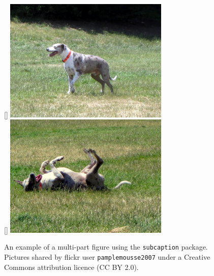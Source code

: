 \documentclass[12pt,xetex]{scrbook}
\begin{document}
\begin{onehalfspace}
\begin{figure}
  \centering
  [\textwidth]%
  {\includegraphics[width=0.7\textwidth]{dog-1}}\\
  \vspace{1cm}
  [\textwidth]%
  {\includegraphics[width=0.7\textwidth]{dog-2}}%
  \caption{An example of a multi-part figure using the
    \texttt{subcaption} package. Pictures shared by flickr user
    \texttt{pamplemousse2007} under a Creative Commons attribution
    licence (CC BY 2.0).}
  \label{fig:dog-figure}
\end{figure}





\end{onehalfspace}
\end{document}
